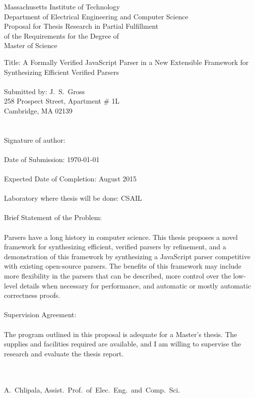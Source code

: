 \documentclass{article}
\begin{document}
\thispagestyle{empty}
\begin{center}
Massachusetts Institute of Technology \\
Department of Electrical Engineering and Computer Science \\ $\left.\right.$ \\
Proposal for Thesis Research in Partial Fulfillment \\
of the Requirements for the Degree of \\
Master of Science
\end{center}
\noindent Title: A Formally Verified JavaScript Parser in a New Extensible Framework for Synthesizing Efficient Verified Parsers \\ \\
Submitted by: J.~S.~Gross \\
\phantom{Submitted by: }258 Prospect Street, Apartment \# 1L \\
\phantom{Submitted by: }Cambridge, MA 02139 \\ \\ \\
Signature of author: \underline{\hspace{20em}} \\ \\
Date of Submission: \today \\ \\
Expected Date of Completion: August 2015 \\ \\
Laboratory where thesis will be done: CSAIL \\ \\
Brief Statement of the Problem: \\ \\
Parsers have a long history in computer science.  This thesis proposes a novel framework for synthesizing efficient, verified parsers by refinement, and a demonstration of this framework by synthesizing a JavaScript parser competitive with existing open-source parsers.  The benefits of this framework may include more flexibility in the parsers that can be described, more control over the low-level details when necessary for performance, and automatic or mostly automatic correctness proofs. \\ \\
Supervision Agreement: \\ \\
The program outlined in this proposal is adequate for a Master's thesis. The supplies and facilities
required are available, and I am willing to supervise the research and evaluate the thesis report. \\ \\
\begin{flushright}
\underline{\hspace*{25em}} \\ $\left.\right.$ \\
A.~Chlipala, Assist.~Prof.~of~Elec.~Eng.~and~Comp.~Sci.
\end{flushright}
\clearpage
\end{document}
